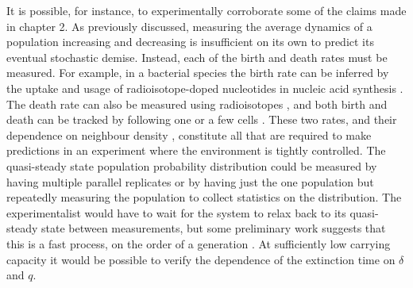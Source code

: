 It is possible, for instance, to experimentally corroborate some of the claims made in chapter 2. %
As previously discussed, measuring the average dynamics of a population increasing and decreasing is insufficient on its own to predict its eventual stochastic demise. 
Instead, each of the birth and death rates must be measured. 
For example, in a bacterial species the birth rate can be inferred by the uptake and usage of radioisotope-doped nucleotides in nucleic acid synthesis \cite{Kirchman1982}. 
The death rate can also be measured using radioisotopes \cite{Servais1985}, and both birth and death can be tracked by following one or a few cells \cite{Wheeler2003,Groisman2005,Wang2010,Lee2012,Grunberger2014}. %
These two rates, and their dependence on neighbour density \cite{Nadell2008,Vulic2001,Greenhalgh1990,VanMelderen2009,Rankin2012}, constitute all that are required to make predictions in an experiment where the environment is tightly controlled. 
The quasi-steady state population probability distribution could be measured by having multiple parallel replicates or by having just the one population but repeatedly measuring the population to collect statistics on the distribution. 
The experimentalist would have to wait for the system to relax back to its quasi-steady state between measurements, but some preliminary work suggests that this is a fast process, on the order of a generation \cite{Badali2019b}. 
At sufficiently low carrying capacity it would be possible to verify the dependence of the extinction time on $\delta$ and $q$. 

